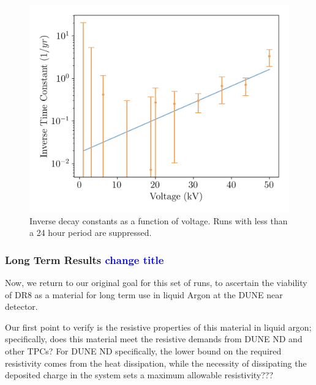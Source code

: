 \documentclass[a4paper,12pt]{article}
\newcommand{\RI}[1]{\textcolor{blue}{#1}}
\begin{document}
\begin{figure}
	\begin{center}
		
		\includegraphics[width=0.75\linewidth]{tau.png}
		\caption{Inverse decay constants as a function of voltage. Runs with less than a 24 hour period are suppressed.} 
		\label{fig:invtaulog}
	\end{center}
	
\end{figure}




\subsubsection{Long Term Results \RI{change title}}
\label{sec:long_term_results}
Now, we return to our original goal for this set of runs, to ascertain the viability of DR8 as a material for long term use in liquid Argon at the DUNE near detector. 

Our first point to verify is the resistive properties of this material in liquid argon; specifically, does this material meet the resistive demands from DUNE ND and other TPCs? For DUNE ND specifically, the lower bound on the required resistivity comes from the heat dissipation, while the necessity of dissipating the deposited charge in the system sets a maximum allowable resistivity???
\end{document}
